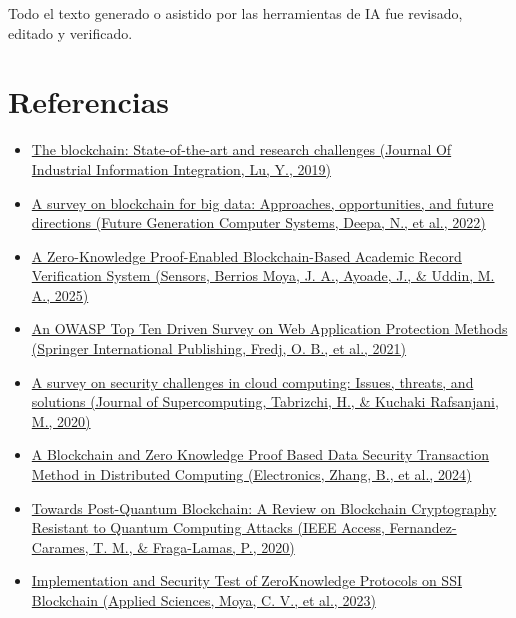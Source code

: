 \documentclass[conference]{IEEEtran}
\begin{document}
Todo el texto generado o asistido por las herramientas de IA fue revisado, editado y verificado.


\section*{Referencias}
\begin{itemize}

    \item 
    \href{https://doi.org/10.1016/j.jii.2019.04.002}{The blockchain: State-of-the-art and research challenges (Journal Of Industrial Information Integration, Lu, Y., 2019)}

    \item 
    \href{https://doi.org/10.1016/j.future.2022.01.017}{A survey on blockchain for big data: Approaches, opportunities, and future directions (Future Generation Computer Systems, Deepa, N., et al., 2022)}

    \item \begin{otherlanguage}{english}
    \href{https://doi.org/10.3390/s25113450}{A Zero-Knowledge Proof-Enabled Blockchain-Based Academic Record Verification System (Sensors, Berrios Moya, J. A., Ayoade, J., \& Uddin, M. A., 2025)}
    \end{otherlanguage}
    \item 
    \href{https://doi.org/10.1007/978-3-030-68887-5_14}{An OWASP Top Ten Driven Survey on Web Application Protection Methods (Springer International Publishing, Fredj, O. B., et al., 2021)}

    \item 
    \href{https://doi.org/10.1007/s11227-020-03213-1}{A survey on security challenges in cloud computing: Issues, threats, and solutions (Journal of Supercomputing, Tabrizchi, H., \& Kuchaki Rafsanjani, M., 2020)}

    \item 
    \href{https://doi.org/10.3390/electronics13214260}{A Blockchain and Zero Knowledge Proof Based Data Security Transaction Method in Distributed Computing (Electronics, Zhang, B., et al., 2024)}
    \item 
    \href{https://doi.org/10.1109/access.2020.2968985}{Towards Post-Quantum Blockchain: A Review on Blockchain Cryptography Resistant to Quantum Computing Attacks (IEEE Access, Fernandez-Carames, T. M., \& Fraga-Lamas, P., 2020)}
    \item 
    \href{https://doi.org/10.3390/app13095552}{Implemen\-tation and Security Test of Zero\-Knowledge Proto\-cols on SSI Block\-chain (Applied Sciences, Moya, C. V., et al., 2023)}

\end{itemize}
\end{document}
